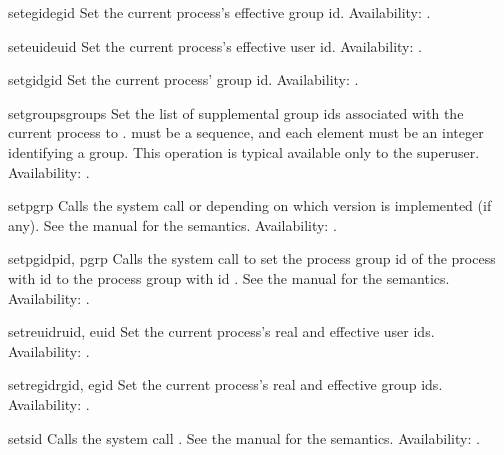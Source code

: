 \begin{funcdesc}{setegid}{egid}
Set the current process's effective group id.
Availability: \UNIX.
\end{funcdesc}

\begin{funcdesc}{seteuid}{euid}
Set the current process's effective user id.
Availability: \UNIX.
\end{funcdesc}

\begin{funcdesc}{setgid}{gid}
Set the current process' group id.
Availability: \UNIX.
\end{funcdesc}

\begin{funcdesc}{setgroups}{groups}
Set the list of supplemental group ids associated with the current
process to .  must be a sequence, and each
element must be an integer identifying a group. This operation is
typical available only to the superuser.
Availability: \UNIX.
\end{funcdesc}

\begin{funcdesc}{setpgrp}{}
Calls the system call  or  depending on which version is implemented (if any).  See the
\UNIX{} manual for the semantics.
Availability: \UNIX.
\end{funcdesc}

\begin{funcdesc}{setpgid}{pid, pgrp} Calls the system call
 to set the process group id of the process with
id  to the process group with id .  See the \UNIX{}
manual for the semantics.
Availability: \UNIX.
\end{funcdesc}

\begin{funcdesc}{setreuid}{ruid, euid}
Set the current process's real and effective user ids.
Availability: \UNIX.
\end{funcdesc}

\begin{funcdesc}{setregid}{rgid, egid}
Set the current process's real and effective group ids.
Availability: \UNIX.
\end{funcdesc}

\begin{funcdesc}{setsid}{}
Calls the system call .  See the \UNIX{} manual
for the semantics.
Availability: \UNIX.
\end{funcdesc}

